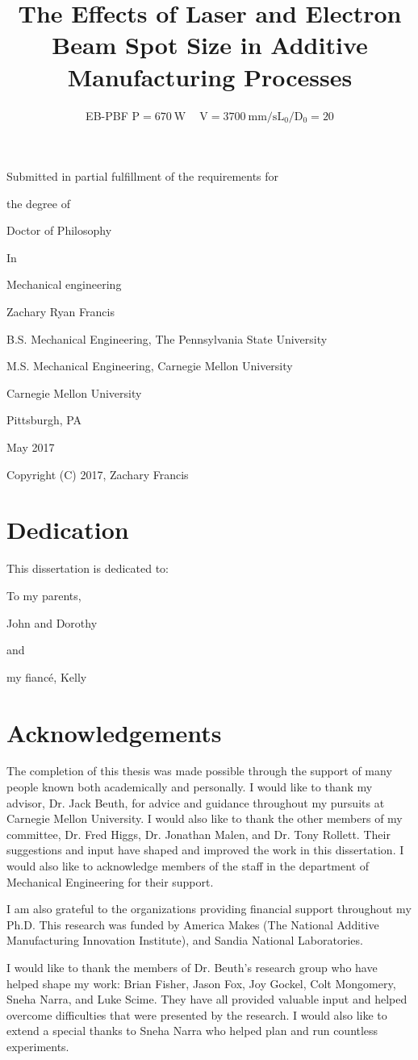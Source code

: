 \documentclass[10pt]{article}
\title{The Effects of Laser and Electron Beam Spot Size in Additive Manufacturing Processes }
\author{EB-PBF $\mathrm{P}=670 \mathrm{~W} \quad \mathrm{~V}=3700 \mathrm{~mm} / \mathrm{s} \mathrm{L}_{0} / \mathrm{D}_{0}=20$}
\date{}
\begin{document}
\maketitle
Submitted in partial fulfillment of the requirements for

the degree of

Doctor of Philosophy

In

Mechanical engineering

Zachary Ryan Francis

B.S. Mechanical Engineering, The Pennsylvania State University

M.S. Mechanical Engineering, Carnegie Mellon University

Carnegie Mellon University

Pittsburgh, PA

May 2017

Copyright (C) 2017, Zachary Francis

\section*{Dedication}
This dissertation is dedicated to:

To my parents,

John and Dorothy

and

my fiancé, Kelly

\section*{Acknowledgements}
The completion of this thesis was made possible through the support of many people known both academically and personally. I would like to thank my advisor, Dr. Jack Beuth, for advice and guidance throughout my pursuits at Carnegie Mellon University. I would also like to thank the other members of my committee, Dr. Fred Higgs, Dr. Jonathan Malen, and Dr. Tony Rollett. Their suggestions and input have shaped and improved the work in this dissertation. I would also like to acknowledge members of the staff in the department of Mechanical Engineering for their support.

I am also grateful to the organizations providing financial support throughout my Ph.D. This research was funded by America Makes (The National Additive Manufacturing Innovation Institute), and Sandia National Laboratories.

I would like to thank the members of Dr. Beuth's research group who have helped shape my work: Brian Fisher, Jason Fox, Joy Gockel, Colt Mongomery, Sneha Narra, and Luke Scime. They have all provided valuable input and helped overcome difficulties that were presented by the research. I would also like to extend a special thanks to Sneha Narra who helped plan and run countless experiments.
\end{document}
